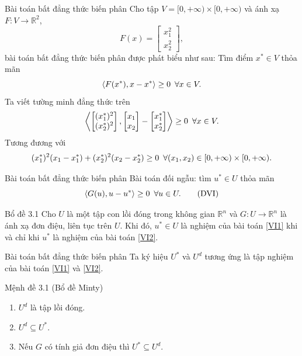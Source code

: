 \documentclass[aspectratio=169]{beamer}
\DeclarePairedDelimiter{\pro}{\langle}{\rangle}
\theoremstyle{plain}
\theoremstyle{definition}
\theoremstyle{remark}
\begin{document}
\begin{frame}{Bài toán bất đẳng thức biến phân}
Cho tập $V = [0,+\infty)\times[0,+\infty)$ và ánh xạ $F: V\to\mathbb{R}^2$,
$$
F(x) = \begin{bmatrix}
x_1^2\\ x_2^2
\end{bmatrix},
$$
bài toán bất đẳng thức biến phân được phát biểu như sau: Tìm điểm $x^*\in V$ thỏa mãn 
$$
\pro{F(x^*),x-x^*}\geq 0\enskip\forall x\in V.
$$
Ta viết tường minh đẳng thức trên
$$
\pro*{\begin{bmatrix}
(x_1^*)^2\\ (x_2^*)^2
\end{bmatrix}, \begin{bmatrix}
x_1\\ x_2
\end{bmatrix}-\begin{bmatrix}
x_1^*\\ x_2^*
\end{bmatrix}}\geq 0 \enskip\forall x\in V.
$$
Tương đương với 
$$
(x_1^*)^2(x_1-x_1^*)+(x_2^*)^2(x_2-x_2^*)\geq0 \enskip\forall (x_1,x_2)\in[0,+\infty)\times[0,+\infty).
$$
\end{frame}
\begin{frame}{Bài toán bất đẳng thức biến phân}
Bài toán đối ngẫu: tìm $u^*\in U$ thỏa mãn
\begin{equation}
    \pro{G(u), u-u^*}\geq 0\enskip\forall u\in U.
    \label{VI2}\tag{DVI}
\end{equation}
\begin{block}{Bổ đề 3.1}
    Cho $U$ là một tập con lồi đóng trong không gian $\mathbb{R}^n$ và $G:U\to  \mathbb{R}^n$ là ánh xạ đơn điệu, liên tục trên $U$. Khi đó, $u^*\in U$ là nghiệm của bài toán \eqref{VI1} khi và chỉ khi $u^*$ là nghiệm của bài toán \eqref{VI2}.
\end{block}
\end{frame}

\begin{frame}{Bài toán bất đẳng thức biến phân}
Ta ký hiệu $U^*$ và $U^d$ tương ứng là tập nghiệm của bài toán \eqref{VI1} và \eqref{VI2}.
\begin{block}{Mệnh đề 3.1 (Bổ đề Minty)}
\begin{enumerate}
    \item $U^d$ là tập lồi đóng.
    \item $U^d\subseteq U^*$.
    \item Nếu $G$ có tính giả đơn điệu thì $U^*\subseteq U^d.$
\end{enumerate}
\end{block}
\end{frame}
\end{document}
